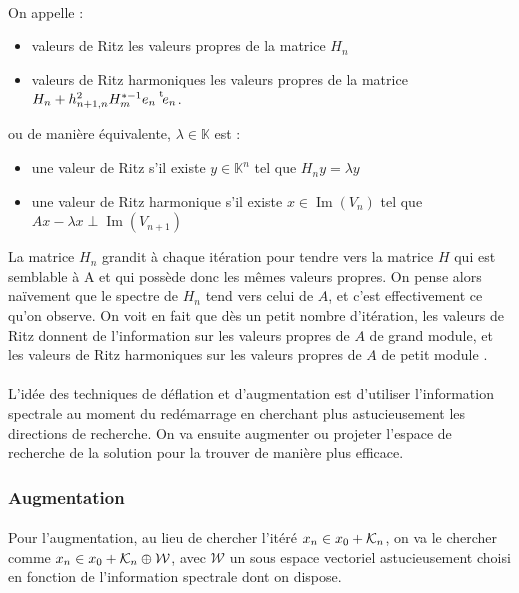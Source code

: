     \paragraph{}
    On appelle :
    \begin{itemize}
      \item valeurs de Ritz les valeurs propres de la matrice $H_n$
      \item valeurs de Ritz harmoniques les valeurs propres de la matrice $H_n + h_{n+1,n}^2H_m^{*-1}e_n\mskip1mu\prescript{\smash{\mathrm t\mkern-3mu}}{}{\mathstrut e_n}$.
    \end{itemize}
    ou de manière équivalente, $\lambda\in\mathbb{K}$ est :
    \begin{itemize}
      \item une valeur de Ritz s'il existe $y\in\mathbb{K}^n$ tel que $H_ny = \lambda y$
      \item une valeur de Ritz harmonique s'il existe $x \in \operatorname{Im}\left(V_n\right)$ tel que $Ax - \lambda x \perp \operatorname{Im}\left(V_{n+1}\right)$
    \end{itemize}
    La matrice $H_n$ grandit à chaque itération pour tendre vers la matrice $H$ qui est semblable à A et qui possède donc les mêmes valeurs propres.
    On pense alors naïvement que le spectre de $H_n$ tend vers celui de $A$, et c'est effectivement ce qu'on observe.
    On voit en fait que dès un petit nombre d'itération, les valeurs de Ritz donnent de l'information sur les valeurs propres de $A$ de grand module, et les valeurs de Ritz harmoniques sur les valeurs propres de $A$ de petit module \cite{Pinel2010, TrefethenBau1997}.

    \paragraph{}
    L'idée des techniques de déflation et d'augmentation est d'utiliser l'information spectrale au moment du redémarrage en cherchant plus astucieusement les directions de recherche.
    On va ensuite augmenter ou projeter l'espace de recherche de la solution pour la trouver de manière plus efficace.


    \subsubsection{Augmentation}

      \paragraph{}
      Pour l'augmentation, au lieu de chercher l'itéré $x_n \in x_0 + \krylov{n}$, on va le chercher comme $x_n \in x_0 + \krylov{n} \oplus \mathcal{W}$, avec $\mathcal{W}$ un sous espace vectoriel astucieusement choisi en fonction de l'information spectrale dont on dispose.

